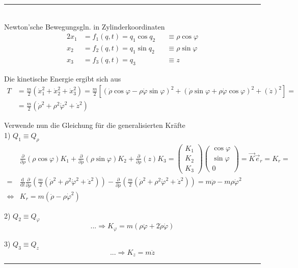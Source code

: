 \documentclass{article}
\newcommand{\diff}{\mathrm{d}}
\newcommand{\lr}[1]{\left(#1\right)}
\newcommand{\lreck}[1]{\left[#1\right]}
\begin{document}
{\color{blue}
\hrule
	\\
	Newton'sche Bewegungsgln. in Zylinderkoordinaten
		\begin{alignat*}{2}
			x_1 &= f_1(q,t) =  q_1 \cos q_2 &&\equiv \rho \cos\varphi \\
			x_2 &= f_2(q,t) = q_1 \sin q_2 &&\equiv \rho \sin\varphi \\
			x_3 &= f_3(q,t) = q_3 &&\equiv z
		\end{alignat*}
	
	Die kinetische Energie ergibt sich aus
		\begin{align*}
			T &= \frac{m}{2}(\dot{x}_1^2 + \dot{x}_2^2 + \dot{x}_3^2) = \frac{m}{2} \lreck{ (\dot{\rho}\cos\varphi -\rho\dot{\varphi}\sin\varphi)^2 + (\dot{\rho}\sin\varphi + \rho\dot{\varphi}\cos\varphi)^2 + (\dot{z})^2 } = \\
			&= \frac{m}{2} (\dot{\rho}^2 + \rho^2\dot{\varphi}^2 + \dot{z}^2)
		\end{align*}

	Verwende nun die Gleichung für die generalisierten Kräfte\\
	1) $Q_1 \equiv Q_{\rho}$
		\begin{align*}
			& \frac{\partial}{\partial \rho} (\rho\cos\varphi) K_1 + \frac{\partial}{\partial \rho} (\rho\sin\varphi) K_2 + \frac{\partial}{\partial \rho} (z) K_3 =
			\begin{pmatrix}
				K_1\\K_2\\K_3
			\end{pmatrix}
			\begin{pmatrix}
				\cos\varphi\\ \sin\varphi\\ 0
			\end{pmatrix}
			= \vec{K} \vec{e}_r = K_r = \\
			=& \frac{\diff}{\diff t} \frac{\partial}{\partial \rho} \lr{ \frac{m}{2} (\dot{\rho}^2 + \rho^2\dot{\varphi}^2 + \dot{z}^2) } - \frac{\partial}{\partial \rho} \lr{ \frac{m}{2} (\dot{\rho}^2 + \rho^2\dot{\varphi}^2 + \dot{z}^2) } = m \ddot{\rho} - m\rho\dot{\varphi}^2 \\
			\Leftrightarrow & K_r =  m (\ddot{\rho} - \rho\dot{\varphi}^2)
		\end{align*}
	
	2) $Q_2 \equiv Q_{\varphi}$
		$$...\Rightarrow K_{\varphi} = m(\rho\ddot{\varphi} + 2\dot{\rho}\dot{\varphi})$$
		
	3) $Q_3 \equiv Q_z$
		$$...\Rightarrow K_z = m\ddot{z}$$
\hrule
}
\end{document}

